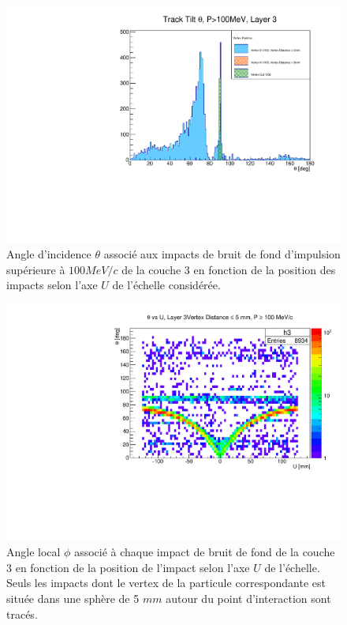 \begin{appendices}
  \begin{figure}[!htb]
    \centering    
    \includegraphics[scale=0.58]{./figures/Track_Tilts_Beamstrahlung/beamstrahlung_Theta/Track_Tilts_Theta_P_sup_100MeV_Layer3.pdf}
    \caption{Angle d'incidence $\theta$ associ\'e aux impacts de bruit de fond d'impulsion sup\'erieure \`a $100 MeV/c$ de la couche 3 en fonction de la position des impacts selon l'axe $U$ de l'\'echelle consid\'er\'ee.}
    \label{fig:theta_Layer3_pT_sup_100MeV}
  \end{figure}

  \begin{figure}[!htb]
    \centering
    \includegraphics[scale=0.58]{./figures/Track_Tilts_Beamstrahlung/beamstrahlung_Theta/Track_Tilts_Theta_vs_U_P_sup_100MeV_vertex_inf_5mm_Layer3.pdf}
    \caption{Angle local $\phi$ associ\'e \`a chaque impact de bruit de fond de la couche 3 en fonction de la position de l'impact selon l'axe $U$ de l'\'echelle. Seuls les impacts dont le vertex de la particule correspondante est situ\'ee dans une sph\`ere de 5 $mm$ autour du point d'interaction sont trac\'es.}
    \label{fig:theta_Layer3_vs_U_P_sup_100MeV_vertex_inf_5mm}
  \end{figure}
 

\end{appendices}

